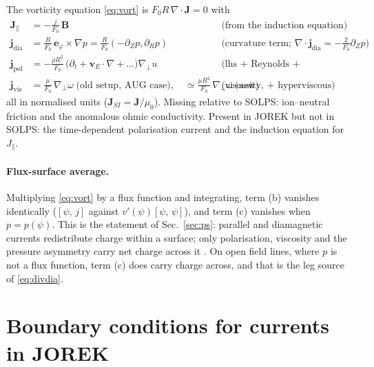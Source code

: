 \documentclass[11pt,a4paper]{article}
\newcommand{\bB}{\mathbf{B}}
\newcommand{\bJ}{\mathbf{J}}
\newcommand{\ephi}{\mathbf{e}_\varphi}
\newcommand{\gradp}{\nabla_{\!\perp}}
\newcommand{\divg}{\nabla\!\cdot\!}
\newcommand{\Jpar}{J_\parallel}
\newcommand{\jdia}{\mathbf{j}_{\mathrm{dia}}}
\newcommand{\jpol}{\mathbf{j}_{\mathrm{pol}}}
\newcommand{\jvis}{\mathbf{j}_{\mathrm{vis}}}
\newcommand{\pb}[2]{\left[#1,\,#2\right]}
\newcommand{\vE}{\mathbf{v}_E}
\begin{document}
\begin{tcolorbox}[key={Key: the currents JOREK has}]
The vorticity equation \eqref{eq:vort} is $F_0 R\,\divg\bJ = 0$ with
\begin{align*}
  \bJ_\parallel &= -\frac{j}{F_0}\,\bB &&\text{(from the induction equation)}\\
  \jdia &= \frac{R}{F_0}\,\ephi\times\nabla p = \frac{R}{F_0}(-\partial_Z p, \partial_R p) &&\text{(curvature term; } \divg\jdia = -\tfrac{2}{F_0}\partial_Z p\text{)}\\
  \jpol &= -\frac{\rho R^2}{F_0}\,\Big(\partial_t + \vE\cdot\nabla + \dots\Big)\gradp u &&\text{(lhs + Reynolds + gyroviscous)}\\
  \jvis &= \frac{\mu}{F_0}\,\gradp\omega \;\text{(old setup, AUG case)},\quad \simeq\frac{\mu R^2}{F_0}\,\gradp\omega \;\text{(new)} &&\text{(viscosity, + hyperviscous)}
\end{align*}
all in normalised units ($\bJ_{SI} = \bJ/\mu_0$). Missing relative to SOLPS: ion--neutral friction and the anomalous
ohmic conductivity. Present in JOREK but not in SOLPS: the time-dependent polarisation current and the induction
equation for $\Jpar$.
\end{tcolorbox}

\paragraph{Flux-surface average.} Multiplying \eqref{eq:vort} by a flux function and integrating, term (b) vanishes
identically ($\pb{\psi}{j}$ against $v'(\psi)\pb{\psi}{\psi}$), and term (c) vanishes when $p = p(\psi)$. This is the
statement of Sec.~\ref{sec:ps}: parallel and diamagnetic currents redistribute charge within a surface; only
polarisation, viscosity and the pressure asymmetry carry net charge across it \cite{ernote}. On open field lines,
where $p$ is not a flux function, term (c) does carry charge across, and that is the leg source of \eqref{eq:divdia}.

\section{Boundary conditions for currents in JOREK}
\end{document}
